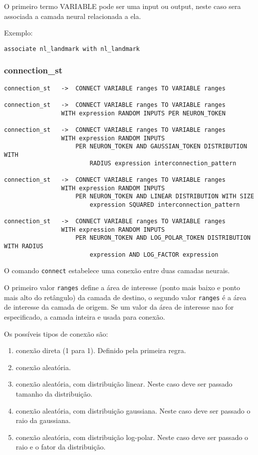 \documentclass[a4paper,10pt]{article}
\begin{document}
O primeiro termo VARIABLE pode ser uma input ou output, neste caso sera associada a camada neural relacionada a ela.

Exemplo:
\begin{lstlisting}
associate nl_landmark with nl_landmark
\end{lstlisting}
\vspace{10mm}

	\subsubsection{connection\_st}
		\begin{lstlisting}
connection_st	->	CONNECT VARIABLE ranges TO VARIABLE ranges

connection_st	->	CONNECT VARIABLE ranges TO VARIABLE ranges
				WITH expression RANDOM INPUTS PER NEURON_TOKEN

connection_st	->	CONNECT VARIABLE ranges TO VARIABLE ranges
				WITH expression RANDOM INPUTS
					PER NEURON_TOKEN AND GAUSSIAN_TOKEN DISTRIBUTION WITH
						RADIUS expression interconnection_pattern

connection_st	->	CONNECT VARIABLE ranges TO VARIABLE ranges
				WITH expression RANDOM INPUTS
					PER NEURON_TOKEN AND LINEAR DISTRIBUTION WITH SIZE
						expression SQUARED interconnection_pattern

connection_st	->	CONNECT VARIABLE ranges TO VARIABLE ranges
				WITH expression RANDOM INPUTS
					PER NEURON_TOKEN AND LOG_POLAR_TOKEN DISTRIBUTION WITH RADIUS
						expression AND LOG_FACTOR expression

		\end{lstlisting}
O comando \texttt{connect} estabelece uma conex\~{a}o entre duas camadas neurais.

O primeiro valor \texttt{ranges} define a \'area de interesse (ponto mais baixo e ponto mais alto do ret\^angulo) da camada de destino, o segundo valor \texttt{ranges} \'e a \'area de interesse da camada de origem. Se um valor da \'area de interesse nao for especificado, a camada inteira e usada para conex\~ao.

Os poss\'iveis tipos de conex\~{a}o s\~{a}o:
	\begin{enumerate}
	 \item conex\~{a}o direta (1 para 1). Definido pela primeira regra.
	 \item conex\~{a}o aleat\'oria.
	 \item conex\~{a}o aleat\'oria, com distribui\c{c}\~{a}o linear. Neste caso deve ser passado tamanho da distribui\c{c}\~{a}o.
	 \item conex\~{a}o aleat\'oria, com distribui\c{c}\~{a}o gaussiana. Neste caso deve ser passado o raio da gaussiana.
	 \item conex\~{a}o aleat\'oria, com distribui\c{c}\~{a}o log-polar. Neste caso deve ser passado o raio e o fator da distribui\c{c}\~{a}o.
	\end{enumerate}
\end{document}

